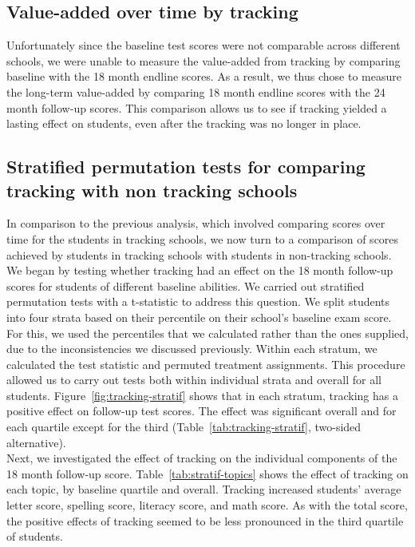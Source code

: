 \documentclass[11pt]{article}
\begin{document}
 \subsection{Value-added over time by tracking}
Unfortunately since the baseline test scores were not comparable across different schools, we were unable to measure the value-added from tracking by comparing baseline with the 18 month endline scores. As a result, we thus chose to measure the long-term value-added by comparing 18 month endline scores with the 24 month follow-up scores. This comparison allows us to see if tracking yielded a lasting effect on students, even after the tracking was no longer in place.



 \subsection{Stratified permutation tests for comparing tracking with non tracking schools}

In comparison to the previous analysis, which involved comparing scores over time for the students in tracking schools, we now turn to a comparison of scores achieved by students in tracking schools with students in non-tracking schools. \\
 
We began by testing whether tracking had an effect on the 18 month follow-up scores for students of different baseline abilities.  We carried out stratified permutation tests with a t-statistic to address this question. We split students into four strata based on their percentile on their school's baseline exam score.  For this, we used the percentiles that we calculated rather than the ones supplied, due to the inconsistencies we discussed previously.  Within each stratum, we calculated the test statistic and permuted treatment assignments.  This procedure allowed us to carry out tests both within individual strata and overall for all students.  Figure~\ref{fig:tracking-stratif} shows that in each stratum, tracking has a positive effect on follow-up test scores.  The effect was significant overall and for each quartile except for the third (Table~\ref{tab:tracking-stratif}, two-sided alternative). \\

Next, we investigated the effect of tracking on the individual components of the 18 month follow-up score.  Table~\ref{tab:stratif-topics} shows the effect of tracking on each topic, by baseline quartile and overall.  Tracking increased students' average letter score, spelling score, literacy score, and math score.  As with the total score, the positive effects of tracking seemed to be less pronounced in the third quartile of students. \\
\end{document}
